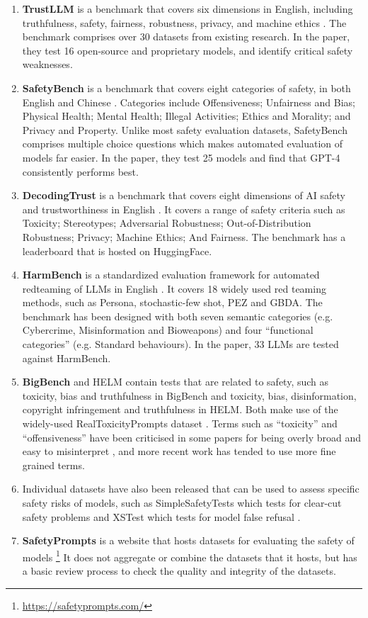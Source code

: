 \begin{enumerate}
    \item \textbf{TrustLLM} is a benchmark that covers six dimensions in English, including truthfulness, safety, fairness, robustness, privacy, and machine ethics \citep{sun2024trustllm}. The benchmark comprises over 30 datasets from existing research. In the paper, they test 16 open-source and proprietary models, and identify critical safety weaknesses. 
    \item \textbf{SafetyBench} is a benchmark that covers eight categories of safety, in both English and Chinese \citep{zhang2023safetybench}. Categories include Offensiveness; Unfairness and Bias; Physical Health; Mental Health; Illegal Activities; Ethics and Morality; and Privacy and Property. Unlike most safety evaluation datasets, SafetyBench comprises multiple choice questions which makes automated evaluation of models far easier. In the paper, they test 25 models and find that GPT-4 consistently performs best.
    \item \textbf{DecodingTrust} is a benchmark that covers eight dimensions of AI safety and trustworthiness in English \citep{wang2024decodingtrust}. It covers a range of safety criteria such as Toxicity; Stereotypes; Adversarial Robustness; Out-of-Distribution Robustness; Privacy; Machine Ethics; And Fairness. The benchmark has a leaderboard that is hosted on HuggingFace.
    \item \textbf{HarmBench} is a standardized evaluation framework for automated redteaming of LLMs in English \citep{mazeika2024harmbench}. It covers 18 widely used red teaming methods, such as Persona, stochastic-few shot, PEZ and GBDA. The benchmark has been designed with both seven semantic categories (e.g. Cybercrime, Misinformation and Bioweapons) and four “functional categories” (e.g. Standard behaviours). In the paper, 33 LLMs are tested against HarmBench.
    \item \textbf{BigBench} \citep{srivastava2023imitation} and HELM \citep{liang2023holistic} contain tests that are related to safety, such as toxicity, bias and truthfulness in BigBench and toxicity, bias, disinformation, copyright infringement and truthfulness in HELM. Both make use of the widely-used RealToxicityPrompts dataset \citep{gehman-etal-2020-realtoxicityprompts}. Terms such as ``toxicity'' and ``offensiveness'' have been criticised in some papers for being overly broad and easy to misinterpret \citep{vidgen-etal-2019-challenges}, and more recent work has tended to use more fine grained terms. 
    \item Individual datasets have also been released that can be used to assess specific safety risks of models, such as SimpleSafetyTests which tests for clear-cut safety problems \citep{vidgen2023simplesafetytests} and XSTest which tests for model false refusal \citep{röttger2024xstest}.
    \item \textbf{SafetyPrompts} is a website that hosts datasets for evaluating the safety of models \footnote{\url{https://safetyprompts.com/}} It does not aggregate or combine the datasets that it hosts, but has a basic review process to check the quality and integrity of the datasets.
   

\end{enumerate}
